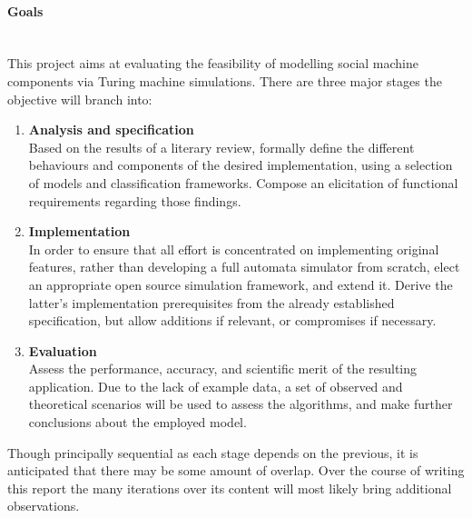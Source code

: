 \documentclass[12pt]{article}
\begin{document}
		\paragraph{Goals}\hfill\\
		\label{sec:goals}
			This project aims at evaluating the feasibility of modelling social machine components via Turing machine simulations.
			There are three major stages the objective will branch into:
			\begin{enumerate}[leftmargin=*, label=\textit{Stage \arabic*}]
				\item \textbf{Analysis and specification} \\
					Based on the results of a literary review, formally define the different behaviours and components of the desired implementation, using a selection of models and classification frameworks. 
					Compose an elicitation of functional requirements regarding those findings.
				\item \textbf{Implementation} \\
					In order to ensure that all effort is concentrated on implementing original features, rather than developing a full automata simulator from scratch, elect an appropriate open source simulation framework, and extend it.
					Derive the latter's implementation prerequisites from the already established specification, but allow additions if relevant, or compromises if necessary.
				\item \textbf{Evaluation} \\
					Assess the performance, accuracy, and scientific merit of the resulting application.
					Due to the lack of example data, a set of observed and theoretical scenarios will be used to assess the algorithms, and make further conclusions about the employed model.
			\end{enumerate}
			Though principally sequential as each stage depends on the previous, it is anticipated that there may be some amount of overlap. 
			Over the course of writing this report the many iterations over its content will most likely bring additional observations.
	
\end{document}
